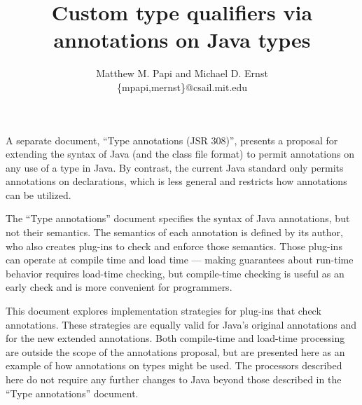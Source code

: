 \documentclass[10pt]{article}
\begin{document}
\newcommand{\code}[1]{\ifmmode{\mbox{\smaller\ttfamily{#1}}}\else{\smaller\ttfamily #1}\fi}

\makeatletter
\def\topfigrule{\kern3\p@ \hrule \kern -3.4\p@} %
\def\botfigrule{\kern-3\p@ \hrule \kern 2.6\p@} %
\def\dblfigrule{\kern3\p@ \hrule \kern -3.4\p@} %
\makeatother



\title{Custom type qualifiers via annotations on Java types}
\author{Matthew M. Papi and Michael D. Ernst \\
\{{\ttfamily mpapi},{\ttfamily mernst}\}{\ttfamily @csail.mit.edu}
}
\maketitle


A separate document, ``Type annotations (JSR 308)'', presents a proposal for
extending the syntax of Java (and the class file format) to permit
annotations on any use of a type in Java.  By contrast, the current Java
standard only permits annotations on declarations, which is less general
and restricts how annotations can be utilized.

The ``Type annotations'' document specifies the syntax of Java
annotations, but not their semantics.  The semantics of each annotation is
defined by its author, who also creates plug-ins to check and enforce those
semantics.  Those plug-ins can operate at compile time and load time ---
making guarantees about run-time behavior requires load-time checking, but
compile-time checking is useful as an early check and is more convenient
for programmers.

This document explores implementation strategies for plug-ins that check
annotations.  These strategies are equally valid for Java's original
annotations and for the new extended annotations.  Both compile-time and
load-time processing are outside the scope of the annotations proposal, but
are presented here as an example of how annotations on types might be used.
The processors described here do not require any further changes to Java
beyond those described in the ``Type annotations'' document.
\end{document}
